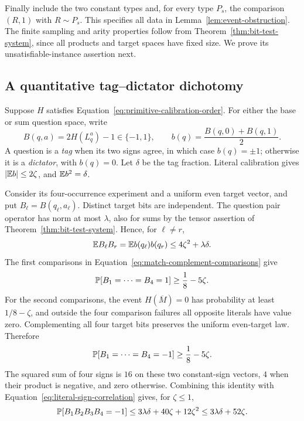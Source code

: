 Finally include the two constant types and, for every type $P_s$,
the comparison $(R,1)$ with $R\sim P_s$. This specifies all data in
Lemma~\ref{lem:event-obstruction}. The finite sampling and arity
properties follow from Theorem~\ref{thm:bit-test-system}, since all
products and target spaces have fixed size. We prove its
unsatisfiable-instance assertion next.

\subsection{A quantitative tag--dictator dichotomy}

Suppose $H$ satisfies Equation~\ref{eq:primitive-calibration-order}.
For either the base or sum question space, write
\[
 B(q,a)=2H(L_q^a)-1\in\{-1,1\},\qquad
 b(q)=\frac{B(q,0)+B(q,1)}2.
\]
A question is a \emph{tag} when its two signs agree, in which case
$b(q)=\pm1$; otherwise it is a \emph{dictator}, with $b(q)=0$.
Let $\delta$ be the tag fraction. Literal calibration gives
$|\mathbb E b|\leq2\zeta$, and $\mathbb E b^2=\delta$.

Consider its four-occurrence experiment and a uniform even target
vector, and put $B_\ell=B(q_\ell,a_\ell)$. Distinct target bits are
independent. The question pair operator has norm at most $\lambda$,
also for sums by the tensor assertion of
Theorem~\ref{thm:bit-test-system}. Hence, for $\ell\ne r$,
\begin{equation}\label{eq:literal-sign-correlation}
 \mathbb E B_\ell B_r
 =\mathbb E b(q_\ell)b(q_r)
 \leq4\zeta^2+\lambda\delta.
\end{equation}
The first comparisons in
Equation~\ref{eq:match-complement-comparisons} give
\[
 \mathbb P[B_1=\cdots=B_4=1]\geq\frac18-5\zeta.
\]
For the second comparisons, the event $H(\overline M)=0$ has
probability at least $1/8-\zeta$, and outside the four comparison
failures all opposite literals have value zero. Complementing all
four target bits preserves the uniform even-target law. Therefore
\[
 \mathbb P[B_1=\cdots=B_4=-1]\geq\frac18-5\zeta.
\]
The squared sum of four signs is $16$ on these two constant-sign
vectors, $4$ when their product is negative, and zero otherwise.
Combining this identity with
Equation~\ref{eq:literal-sign-correlation} gives, for $\zeta\leq1$,
\begin{equation}\label{eq:negative-product-bound}
 \mathbb P[B_1B_2B_3B_4=-1]\leq
 3\lambda\delta+40\zeta+12\zeta^2
 \leq3\lambda\delta+52\zeta.
\end{equation}

